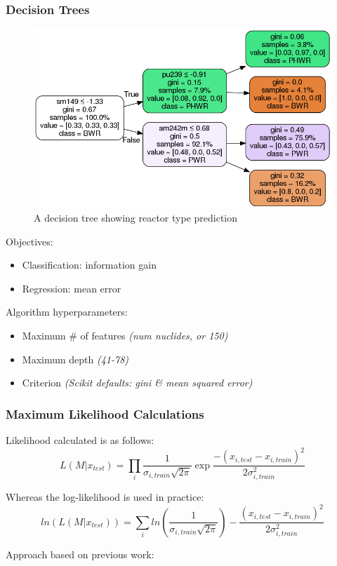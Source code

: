 \begin{frame}
  \frametitle{Decision Trees}
  \begin{adjustwidth}{-15pt}{0pt}
  \begin{minipage}{0.63\textwidth}
    \begin{figure}
      \centering
      \includegraphics[width=\textwidth]{./figures/dtree.png}
      \caption{A decision tree showing reactor type prediction}
    \end{figure}
  \end{minipage}%
  \hfill
  \begin{minipage}{0.4\textwidth}
    Objectives: %
    \begin{itemize}
      \item Classification: information gain
      \item Regression: mean error
    \end{itemize}
    Algorithm hyperparameters:
    \begin{itemize}
      \item Maximum \# of features \textit{(num nuclides, or 150)}
      \item Maximum depth \textit{(41-78)}
      \item Criterion \textit{(Scikit defaults: gini \& mean squared error)}
    \end{itemize}
  \end{minipage}
  \end{adjustwidth}
\end{frame}

\begin{frame}
  \frametitle{Maximum Likelihood Calculations}

Likelihood calculated is as follows:
\[
  L(M|x_{test}) = \prod_i \frac{1}{\sigma_{i,train} \sqrt{2\pi}} \exp{\frac{-(x_{i,test} - x_{i,train})^2}{2 \sigma_{i,train}^2}}
\]

Whereas the log-likelihood is used in practice:
\[
  ln(L(M|x_{test})) = \sum_i ln(\frac{1}{\sigma_{i,train} \sqrt{2\pi}}) - \frac{(x_{i,test} - x_{i,train})^2}{2 \sigma_{i,train}^2}
\]

Approach based on previous work: \cite{mll_method} \\~\\

\end{frame}
